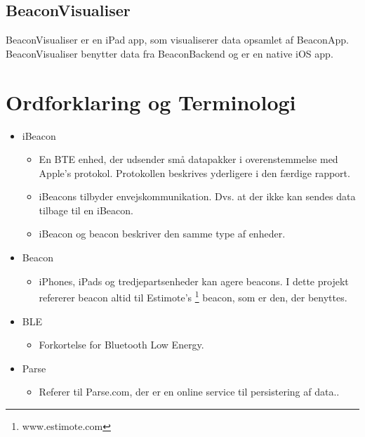 \subsection{BeaconVisualiser}
BeaconVisualiser er en iPad app, som visualiserer data opsamlet af BeaconApp. BeaconVisualiser benytter data fra BeaconBackend og er en native iOS app.

\section{Ordforklaring og Terminologi}

\begin{itemize}
	\item iBeacon
		\begin{itemize}
			\item En BTE enhed, der udsender små datapakker i overenstemmelse med Apple's protokol. Protokollen beskrives yderligere i den færdige rapport.
			\item iBeacons tilbyder envejskommunikation. Dvs. at der ikke kan sendes data tilbage til en iBeacon.
			\item iBeacon og beacon beskriver den samme type af enheder.
		\end{itemize}
		
	\item Beacon
		\begin{itemize}
			\item iPhones, iPads og tredjepartsenheder kan agere beacons. I dette projekt refererer beacon altid til Estimote's \footnote{www.estimote.com} beacon, som er den, der benyttes.
		\end{itemize}
		
	\item BLE
		\begin{itemize}
			\item Forkortelse for Bluetooth Low Energy.
		\end{itemize}
		
	\item Parse
		\begin{itemize}
			\item Referer til Parse.com, der er en online service til persistering af data..
		\end{itemize}
\end{itemize}